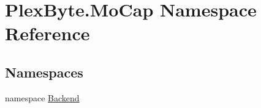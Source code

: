 \hypertarget{namespace_plex_byte_1_1_mo_cap}{}\section{Plex\+Byte.\+Mo\+Cap Namespace Reference}
\label{namespace_plex_byte_1_1_mo_cap}
\subsection*{Namespaces}
\begin{DoxyCompactItemize}
\item 
namespace \hyperlink{namespace_plex_byte_1_1_mo_cap_1_1_backend}{Backend}
\end{DoxyCompactItemize}
